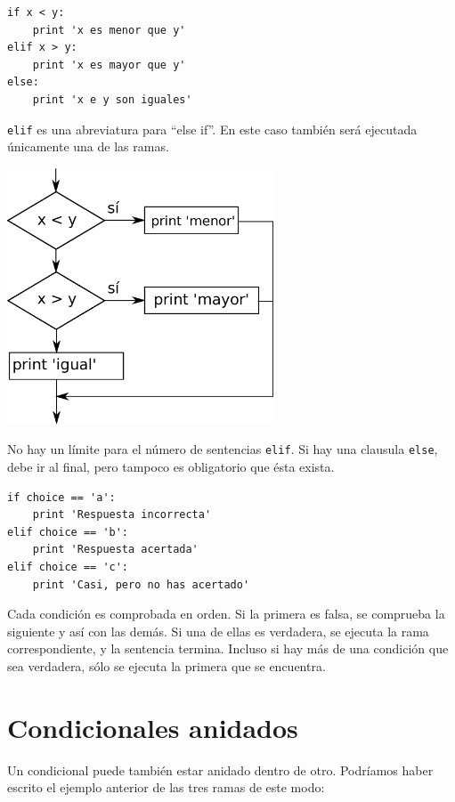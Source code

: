 \beforeverb
\begin{verbatim}
if x < y:
    print 'x es menor que y'
elif x > y:
    print 'x es mayor que y'
else:
    print 'x e y son iguales'
\end{verbatim}
\afterverb
%
{\tt elif} es una abreviatura para ``else if''.  En este caso también
será ejecutada únicamente una de las ramas.

\beforefig
\centerline{\includegraphics[height=3.00in]{figs2/elif.eps}}
\afterfig

No hay un límite para el número de sentencias
{\tt elif}. Si hay una clausula {\tt else}, debe ir
al final, pero tampoco es obligatorio que ésta exista.



\beforeverb
\begin{verbatim}
if choice == 'a':
    print 'Respuesta incorrecta'
elif choice == 'b':
    print 'Respuesta acertada'
elif choice == 'c':
    print 'Casi, pero no has acertado'
\end{verbatim}
\afterverb
%
Cada condición es comprobada en orden. Si la primera es falsa,
se comprueba la siguiente y así con las demás. Si una de ellas es
verdadera, se ejecuta la rama correspondiente, y la sentencia
termina. Incluso si hay más de una condición que sea verdadera, sólo se
ejecuta la primera que se encuentra.

\section{Condicionales anidados}

Un condicional puede también estar anidado dentro de otro. Podríamos
haber escrito el ejemplo anterior de las tres ramas de este modo:

